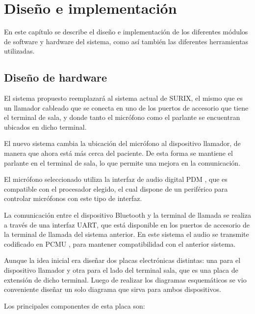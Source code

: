 	\chapter{Diseño e implementación} %

\label{Chapter3}

En este capítulo se describe el diseño e implementación de los diferentes módulos de software y hardware del sistema, como así también las diferentes herramientas utilizadas.




\section{Diseño de hardware}

El sistema propuesto reemplazará al sistema actual de SURIX, el mismo que es un llamador cableado que se conecta en uno de los puertos de accesorio que tiene el terminal de sala, y donde tanto el micrófono como el parlante se encuentran ubicados en dicho terminal.

El nuevo sistema cambia la ubicación del micrófono al dispositivo llamador, de manera que ahora está más cerca del paciente. De esta forma se mantiene el parlante en el terminal de sala, lo que permite una mejora en la comunicación.

El micrófono seleccionado utiliza la interfaz de audio digital PDM \cite{PDM}, que es compatible con el procesador elegido, el cual dispone de un periférico para controlar micrófonos con este tipo de interfaz.

La comunicación entre el dispositivo Bluetooth y la terminal de llamada se realiza a  través de una interfaz UART, que está disponible en los puertos de accesorio de la terminal de llamada del sistema anterior. En este sistema el audio se transmite codificado en PCMU \cite{PCMU}, para mantener compatibilidad con el anterior sistema.

Aunque la idea inicial era diseñar dos placas electrónicas distintas: una para el dispositivo llamador y otra para el lado del terminal sala, que es una placa de extensión de dicho terminal. Luego de realizar los diagramas esquemáticos se vio conveniente diseñar un solo diagrama que sirva para ambos dispositivos. 

Los principales componentes de esta placa son:

